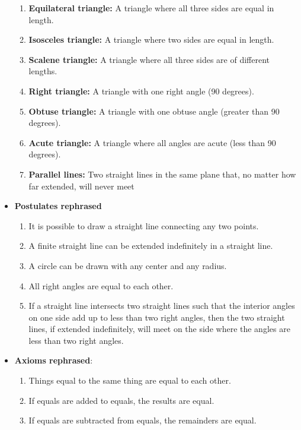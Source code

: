 \documentclass{report}
\begin{document}
\begin{itemize}
\begin{enumerate}
                \item \textbf{Equilateral triangle:} A triangle where all three sides are equal in length.
                \item \textbf{Isosceles triangle:} A triangle where two sides are equal in length.
                \item \textbf{Scalene triangle:} A triangle where all three sides are of different lengths.
                \item \textbf{Right triangle:} A triangle with one right angle (90 degrees).
                \item \textbf{Obtuse triangle:} A triangle with one obtuse angle (greater than 90 degrees).
                \item \textbf{Acute triangle:} A triangle where all angles are acute (less than 90 degrees).
                \item \textbf{Parallel lines:} Two straight lines in the same plane that, no matter how far extended, will never meet
            \end{enumerate}
        \item \textbf{Postulates rephrased}
            \begin{enumerate}
                \item It is possible to draw a straight line connecting any two points.
                \item A finite straight line can be extended indefinitely in a straight line.
                \item A circle can be drawn with any center and any radius.
                \item All right angles are equal to each other.
                \item If a straight line intersects two straight lines such that the interior angles on one side add up to less than two right angles, then the two straight lines, if extended indefinitely, will meet on the side where the angles are less than two right angles.
            \end{enumerate}
        \item \textbf{Axioms rephrased}:
            \begin{enumerate}
                \item Things equal to the same thing are equal to each other.
                \item If equals are added to equals, the results are equal.
                \item If equals are subtracted from equals, the remainders are equal.

\end{enumerate}
\end{itemize}
\end{document}
